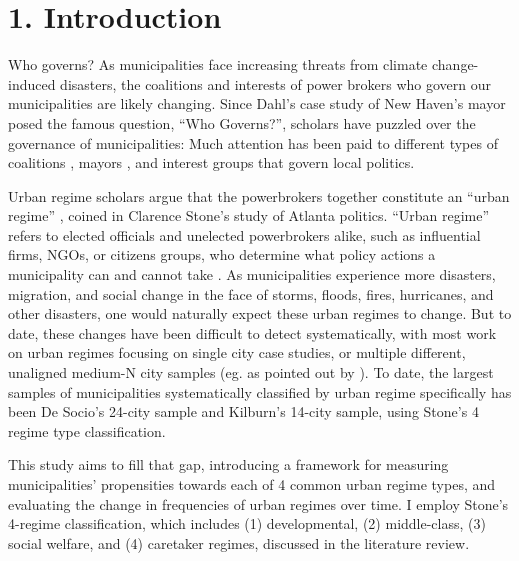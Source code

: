 \documentclass[preprint, 3p,
authoryear]{elsarticle} %
\begin{document}
\hypertarget{introduction}{%
\section{1. Introduction}\label{introduction}}

Who governs? As municipalities face increasing threats from climate
change-induced disasters, the coalitions and interests of power brokers
who govern our municipalities are likely changing. Since Dahl's
\citeyearpar{dahl_1961} case study of New Haven's mayor posed the famous
question, ``Who Governs?'', scholars have puzzled over the governance of
municipalities: Much attention has been paid to different types of
coalitions
\citep{munoz_and_henry_1986, stone_1989, stoker_and_mossberger_1994, gilliam_1996, davies_2017, russo_and_scarnato_2018},
mayors
\citep{ramirez_perez_et_al_2008, debenedictis_kessner_and_warshaw_2016, freier_and_thomasius_2016, einstein_and_glick_2018},
and interest groups
\citep{logan_and_rabrenovic_1990, mossberger_and_stoker_2001, cooper_et_al_2005, portney_and_berry_2016, anzia_2019}
that govern local politics.

Urban regime scholars argue that the powerbrokers together constitute an
``urban regime'' \citep{stone_1993}, coined in Clarence Stone's
\citeyearpar{stone_1989} study of Atlanta politics. ``Urban regime''
refers to elected officials and unelected powerbrokers alike, such as
influential firms, NGOs, or citizens groups, who determine what policy
actions a municipality can and cannot take
\citep{mossberger_and_stoker_2001}. As municipalities experience more
disasters, migration, and social change in the face of storms, floods,
fires, hurricanes, and other disasters, one would naturally expect these
urban regimes to change. But to date, these changes have been difficult
to detect systematically, with most work on urban regimes focusing on
single city case studies, or multiple different, unaligned medium-N city
samples (eg. as pointed out by \citep{cheek_chmutina_2022}). To date,
the largest samples of municipalities systematically classified by urban
regime specifically has been De Socio's \citeyearpar{de_socio_2007}
24-city sample and Kilburn's \citeyearpar{kilburn_2004} 14-city sample,
using Stone's \citeyearpar{stone_1993} 4 regime type classification.

This study aims to fill that gap, introducing a framework for measuring
municipalities' propensities towards each of 4 common urban regime
types, and evaluating the change in frequencies of urban regimes over
time. I employ Stone's \citeyearpar{stone_1993} 4-regime classification,
which includes (1) developmental, (2) middle-class, (3) social welfare,
and (4) caretaker regimes, discussed in the literature review.
\end{document}
